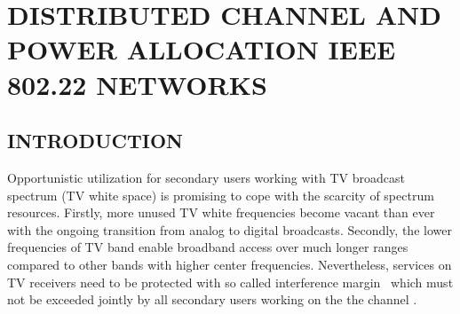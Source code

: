 \chapter{DISTRIBUTED CHANNEL AND POWER ALLOCATION IEEE 802.22 NETWORKS}

\section{INTRODUCTION}


Opportunistic utilization for secondary users working with TV broadcast spectrum (TV white space) is promising to cope with the scarcity of spectrum resources\cite{FCC_2010_sedond_memorandumm}. Firstly, more unused TV white frequencies become vacant than ever with the ongoing transition from analog to digital broadcasts. Secondly, the lower frequencies of TV band enable broadband access over much longer ranges compared to other bands with higher center frequencies. Nevertheless, services on TV receivers need to be protected with so called interference margin~\cite{multipleIntf_pimrc11} which must not be exceeded jointly by all secondary users working on the the channel .

